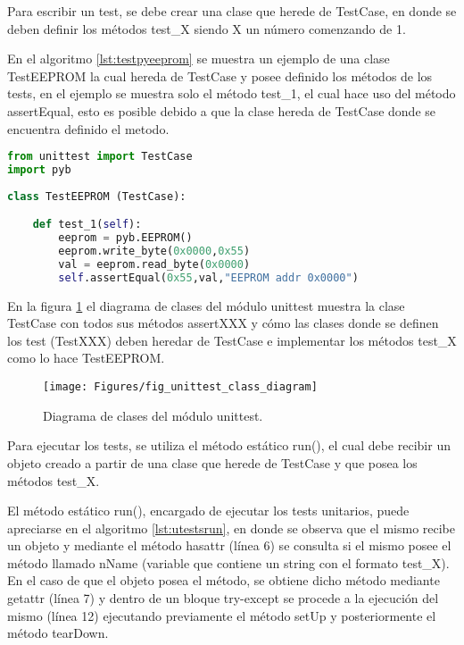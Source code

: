 Para escribir un test, se debe crear una clase que herede de TestCase, en donde se deben definir los métodos test\_X siendo X un número comenzando de 1.

En el algoritmo \ref{lst:testpyeeprom} se muestra un ejemplo de una clase TestEEPROM la cual hereda de TestCase y posee definido los métodos de los tests, en el ejemplo se muestra solo el método test\_1, el cual hace uso del método assertEqual, esto es posible debido a que la clase hereda de TestCase donde se encuentra definido el metodo.

\begin{lstlisting}[label={lst:testpyeeprom},caption=Clase que hereda de TestCase donde se definen los métodos de test para la EEPROM., language={python}]
from unittest import TestCase
import pyb
  
class TestEEPROM (TestCase):

    def test_1(self):
        eeprom = pyb.EEPROM()
        eeprom.write_byte(0x0000,0x55)
        val = eeprom.read_byte(0x0000)
        self.assertEqual(0x55,val,"EEPROM addr 0x0000")       
\end{lstlisting}

En la figura \ref{fig:unittestpythonclassd} el diagrama de clases del módulo unittest muestra la clase TestCase con todos sus métodos assertXXX y cómo las clases donde se definen los test (TestXXX) deben heredar de TestCase e implementar los métodos test\_X como lo hace TestEEPROM.

\begin{figure}[ht]
  \centering
    \texttt{[image: Figures/fig\_unittest\_class\_diagram]}
  \caption{Diagrama de clases del módulo unittest.}
  \label{fig:unittestpythonclassd}
\end{figure}

Para ejecutar los tests, se utiliza el método estático run(), el cual debe recibir un objeto creado a partir de una clase que herede de TestCase y que posea los métodos test\_X.

El método estático run(), encargado de ejecutar los tests unitarios, puede apreciarse en el algoritmo \ref{lst:utestsrun}, en donde se observa que el mismo recibe un objeto y mediante el método hasattr (línea 6) se consulta si el mismo posee el método llamado nName (variable que contiene un string con el formato test\_X). En el caso de que el objeto posea el método, se obtiene dicho método mediante getattr (línea 7) y dentro de un bloque try-except se procede a la ejecución del mismo (línea 12) ejecutando previamente el método setUp y posteriormente el método tearDown.

